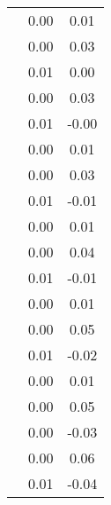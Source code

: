 \begin{table}
\begin{tabular}{c|cc|}
\multicolumn{1}{|c|}{} & \multicolumn{1}{|c|}{      0.00} & \multicolumn{1}{|c|}{      0.01} \\ 
\multicolumn{1}{|c|}{} & \multicolumn{1}{|c|}{      0.00} & \multicolumn{1}{|c|}{      0.03} \\ 
\multicolumn{1}{|c|}{} & \multicolumn{1}{|c|}{      0.01} & \multicolumn{1}{|c|}{      0.00} \\ 
\multicolumn{1}{|c|}{} & \multicolumn{1}{|c|}{      0.00} & \multicolumn{1}{|c|}{      0.03} \\ 
\multicolumn{1}{|c|}{} & \multicolumn{1}{|c|}{      0.01} & \multicolumn{1}{|c|}{     -0.00} \\ 
\multicolumn{1}{|c|}{} & \multicolumn{1}{|c|}{      0.00} & \multicolumn{1}{|c|}{      0.01} \\ 
\multicolumn{1}{|c|}{} & \multicolumn{1}{|c|}{      0.00} & \multicolumn{1}{|c|}{      0.03} \\ 
\multicolumn{1}{|c|}{} & \multicolumn{1}{|c|}{      0.01} & \multicolumn{1}{|c|}{     -0.01} \\ 
\multicolumn{1}{|c|}{} & \multicolumn{1}{|c|}{      0.00} & \multicolumn{1}{|c|}{      0.01} \\ 
\multicolumn{1}{|c|}{} & \multicolumn{1}{|c|}{      0.00} & \multicolumn{1}{|c|}{      0.04} \\ 
\multicolumn{1}{|c|}{} & \multicolumn{1}{|c|}{      0.01} & \multicolumn{1}{|c|}{     -0.01} \\ 
\multicolumn{1}{|c|}{} & \multicolumn{1}{|c|}{      0.00} & \multicolumn{1}{|c|}{      0.01} \\ 
\multicolumn{1}{|c|}{} & \multicolumn{1}{|c|}{      0.00} & \multicolumn{1}{|c|}{      0.05} \\ 
\multicolumn{1}{|c|}{} & \multicolumn{1}{|c|}{      0.01} & \multicolumn{1}{|c|}{     -0.02} \\ 
\multicolumn{1}{|c|}{} & \multicolumn{1}{|c|}{      0.00} & \multicolumn{1}{|c|}{      0.01} \\ 
\multicolumn{1}{|c|}{} & \multicolumn{1}{|c|}{      0.00} & \multicolumn{1}{|c|}{      0.05} \\ 
\multicolumn{1}{|c|}{} & \multicolumn{1}{|c|}{      0.00} & \multicolumn{1}{|c|}{     -0.03} \\ 
\multicolumn{1}{|c|}{} & \multicolumn{1}{|c|}{      0.00} & \multicolumn{1}{|c|}{      0.06} \\ 
\multicolumn{1}{|c|}{} & \multicolumn{1}{|c|}{      0.01} & \multicolumn{1}{|c|}{     -0.04} \\ 

\end{tabular}
\end{table}

